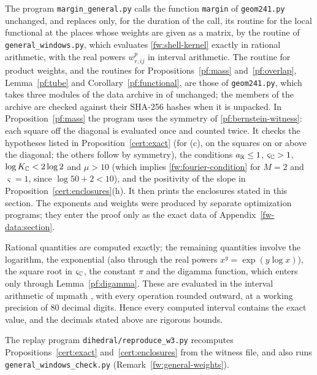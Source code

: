 The program \texttt{margin\_general.py} calls the function \texttt{margin} of
\texttt{geom241.py} unchanged, and replaces only, for
the duration of the call, its routine for the local functional at the places
whose weights are given as a matrix, by the routine of
\texttt{general\_windows.py}, which evaluates \eqref{fw:shell-kernel} exactly
in rational arithmetic, with the real powers $w_{r,ij}^p$ in interval
arithmetic. The routine for product weights, and the routines for
Propositions~\ref{pf:mass} and~\ref{pf:overlap}, Lemma~\ref{pf:tube} and
Corollary~\ref{pf:functional}, are those of \texttt{geom241.py}, which takes
three modules of the data archive in  of
\cite{NaslundCode4317} unchanged; the members of the archive are checked
against their SHA-256 hashes when it is unpacked.
In Proposition~\ref{pf:mass} the program uses the symmetry of
\eqref{pf:bernstein-witness}: each square off the diagonal is evaluated once
and counted twice. It checks the hypotheses listed in
Proposition~\ref{cert:exact} (for (c), on the squares on or above the
diagonal; the others follow by symmetry), the conditions $a_\mathbb R\le1$,
$\varsigma_\mathbb C>1$, $\log K_\mathbb C<2\log2$ and $\mu>10$ (which implies
\eqref{fw:fourier-condition} for $M=2$ and $\varsigma=1$, since $\log50+2<10$),
and the positivity of the slope in Proposition~\ref{cert:enclosures}(h). It
then prints the enclosures stated in this section. The exponents and weights
were produced by separate optimization programs; they enter the proof only
as the exact data of Appendix~\ref{fw-data:section}.

Rational quantities are computed exactly; the remaining quantities involve the
logarithm, the exponential (also through the real powers $x^y=\exp(y\log x)$),
the square root in $\varsigma_\mathbb C$, the constant $\pi$ and the digamma function,
which enters only through Lemma~\ref{pf:digamma}. These are evaluated in the
interval arithmetic of mpmath \cite{Mpmath}, with every operation rounded
outward, at a working precision of $80$ decimal digits. Hence every computed
interval contains the exact value, and the decimals stated above are rigorous
bounds.

The replay program \texttt{dihedral/reproduce\_w3.py} recomputes
Propositions~\ref{cert:exact} and~\ref{cert:enclosures} from the witness file,
and also runs \texttt{general\_windows\_check.py}
(Remark~\ref{fw:general-weights}).
